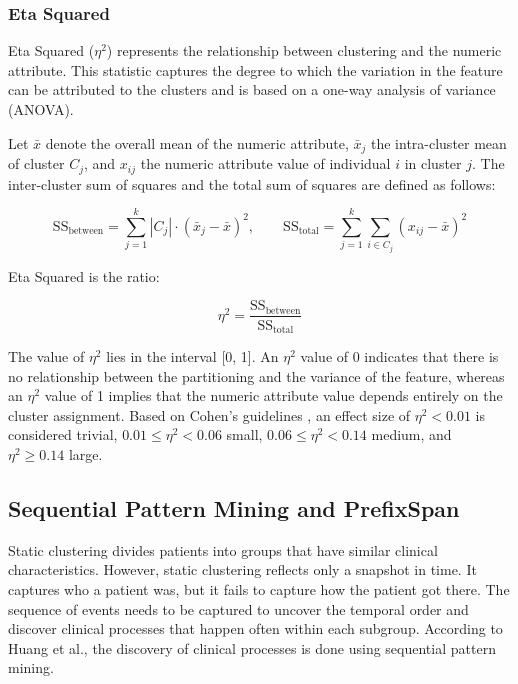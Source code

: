 \subsubsection*{Eta Squared}

Eta Squared ($\eta^2$) represents the relationship between clustering and the numeric attribute. This statistic captures the degree to which the variation in the feature can be attributed to the clusters and is based on a one-way analysis of variance (ANOVA).

Let $\bar{x}$ denote the overall mean of the numeric attribute, $\bar{x}_j$ the intra-cluster mean of cluster $C_j$, and $x_{ij}$ the numeric attribute value of individual $i$ in cluster $j$. The inter-cluster sum of squares and the total sum of squares are defined as follows:

\begin{equation}
    \mathrm{SS}_{\mathrm{between}} = \sum_{j=1}^{k} |C_j| \cdot (\bar{x}_j - \bar{x})^2, \qquad
    \mathrm{SS}_{\mathrm{total}} = \sum_{j=1}^{k} \sum_{i \in C_j} (x_{ij} - \bar{x})^2
    \label{eq:ss}
\end{equation}

Eta Squared is the ratio:

\begin{equation}
    \eta^2 = \frac{\mathrm{SS}_{\mathrm{between}}}{\mathrm{SS}_{\mathrm{total}}}
    \label{eq:eta_squared}
\end{equation}

The value of $\eta^2$ lies in the interval [0, 1]. An $\eta^2$ value of 0 indicates that there is no relationship between the partitioning and the variance of the feature, whereas an $\eta^2$ value of 1 implies that the numeric attribute value depends entirely on the cluster assignment. Based on Cohen's guidelines \cite{cohen1988}, an effect size of $\eta^2 < 0.01$ is considered trivial, $0.01 \leq \eta^2 < 0.06$ small, $0.06 \leq \eta^2 < 0.14$ medium, and $\eta^2 \geq 0.14$ large.
\subsection{Sequential Pattern Mining and PrefixSpan}

Static clustering divides patients into groups that have similar clinical characteristics. However, static clustering reflects only a snapshot in time. It captures who a patient was, but it fails to capture how the patient got there. The sequence of events needs to be captured to uncover the temporal order and discover clinical processes that happen often within each subgroup. According to Huang et al.\cite{huang2014}, the discovery of clinical processes is done using sequential pattern mining.

